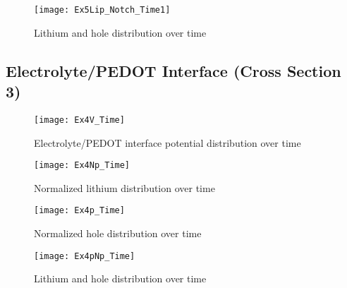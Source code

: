 \begin{landscape}
\begin{figure}[!htp]
\centering
\texttt{[image: Ex5Lip\_Notch\_Time1]}
\caption{Lithium and hole distribution over time} 
\label{}
\end{figure}
\end{landscape}


\clearpage
\subsection{Electrolyte/PEDOT Interface (Cross Section 3) }

\begin{landscape}
\begin{figure}[!htp]
\centering
\texttt{[image: Ex4V\_Time]}
\caption{Electrolyte/PEDOT interface potential distribution over time} 
\label{}
\end{figure}
\end{landscape}


\begin{landscape}
\begin{figure}[!htp]
\centering
\texttt{[image: Ex4Np\_Time]}
\caption{Normalized lithium distribution over time} 
\label{}
\end{figure}
\end{landscape}

\begin{landscape}
\begin{figure}[!htp]
\centering
\texttt{[image: Ex4p\_Time]}
\caption{Normalized hole distribution over time} 
\label{}
\end{figure}
\end{landscape}

\begin{landscape}
\begin{figure}[!htp]
\centering
\texttt{[image: Ex4pNp\_Time]}
\caption{Lithium and hole distribution over time} 
\label{}
\end{figure}
\end{landscape}






